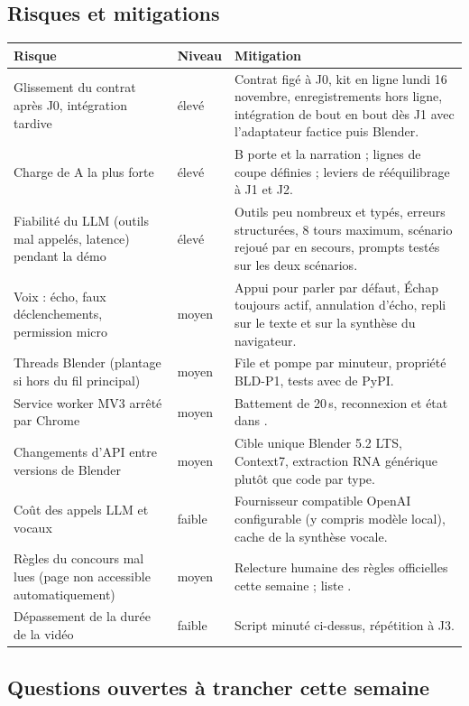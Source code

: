 \subsection{Risques et mitigations}

\begin{xltabular}{\textwidth}{@{}L{4.3cm}L{1.3cm}Y@{}}
\toprule
\textbf{Risque} & \textbf{Niveau} & \textbf{Mitigation} \\
\midrule
Glissement du contrat après J0, intégration tardive & élevé & Contrat figé à J0, kit en ligne lundi 16 novembre, enregistrements hors ligne, intégration de bout en bout dès J1 avec l'adaptateur factice puis Blender. \\
Charge de A la plus forte & élevé & B porte  et la narration ; lignes de coupe définies ; leviers de rééquilibrage à J1 et J2. \\
Fiabilité du LLM (outils mal appelés, latence) pendant la démo & élevé & Outils peu nombreux et typés, erreurs structurées, 8 tours maximum, scénario rejoué par  en secours, prompts testés sur les deux scénarios. \\
Voix : écho, faux déclenchements, permission micro & moyen & Appui pour parler par défaut, Échap toujours actif, annulation d'écho, repli sur le texte et sur la synthèse du navigateur. \\
Threads Blender (plantage si  hors du fil principal) & moyen & File et pompe par minuteur, propriété BLD-P1, tests avec  de PyPI. \\
Service worker MV3 arrêté par Chrome & moyen & Battement de 20\,s, reconnexion et état dans . \\
Changements d'API entre versions de Blender & moyen & Cible unique Blender 5.2 LTS, Context7, extraction RNA générique plutôt que code par type. \\
Coût des appels LLM et vocaux & faible & Fournisseur compatible OpenAI configurable (y compris modèle local), cache de la synthèse vocale. \\
Règles du concours mal lues (page non accessible automatiquement) & moyen & Relecture humaine des règles officielles cette semaine ; liste . \\
Dépassement de la durée de la vidéo & faible & Script minuté ci-dessus, répétition à J3. \\
\bottomrule
\end{xltabular}

\subsection{Questions ouvertes à trancher cette semaine}

